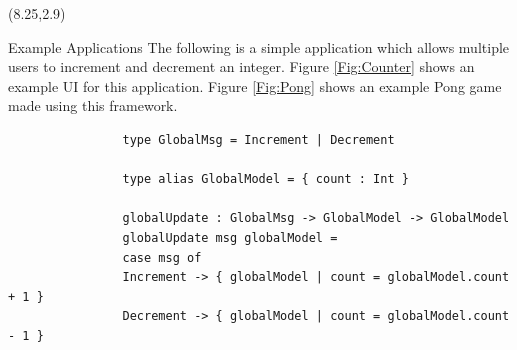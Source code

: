 \documentclass[22pt]{beamer}
\begin{document}
\begin{frame}[fragile]
    \begin{textblock}{7.25}(8.25,2.9)
        \begin{block}{\fontsize{37}{20}\selectfont Example Applications}
            The following is a simple application which allows multiple users to increment and decrement an
            integer. Figure \ref{Fig:Counter} shows an example UI for this application. Figure \ref{Fig:Pong} shows an example Pong game made using this framework.

            \begin{Verbatim}
                type GlobalMsg = Increment | Decrement

                type alias GlobalModel = { count : Int }

                globalUpdate : GlobalMsg -> GlobalModel -> GlobalModel
                globalUpdate msg globalModel =
                case msg of
                Increment -> { globalModel | count = globalModel.count + 1 }
                Decrement -> { globalModel | count = globalModel.count - 1 }
            \end{Verbatim}


\end{block}
\end{textblock}
\end{frame}
\end{document}
